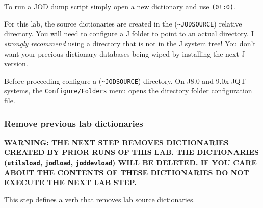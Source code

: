 \documentclass[11pt,letter,landscape]{article}
\begin{document}
To run a JOD dump script simply open a new dictionary and use
\texttt{(0!:0)}.

For this lab, the source dictionaries are created in the
(\texttt{\textasciitilde{}JODSOURCE}) relative directory. You will need
to configure a J folder to point to an actual directory. I
\emph{strongly recommend} using a directory that is not in the J system
tree! You don't want your precious dictionary databases being wiped by
installing the next J version.

Before proceeding configure a (\texttt{\textasciitilde{}JODSOURCE})
directory. On J8.0 and 9.0x JQT systems, the \texttt{Configure/Folders}
menu opens the directory folder configuration file.

    \subsubsection{Remove previous lab
dictionaries}\label{remove-previous-lab-dictionaries}

\textbf{WARNING: THE NEXT STEP REMOVES DICTIONARIES CREATED BY PRIOR
RUNS OF THIS LAB. THE DICTIONARIES (\texttt{utilsload},
\texttt{jodload}, \texttt{joddevload}) WILL BE DELETED. IF YOU CARE
ABOUT THE CONTENTS OF THESE DICTIONARIES DO NOT EXECUTE THE NEXT LAB
STEP.}

This step defines a verb that removes lab source dictionaries.
\end{document}
